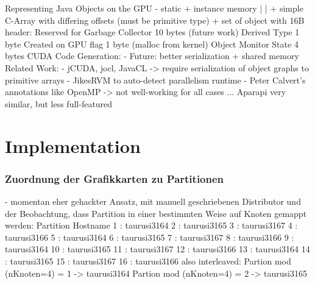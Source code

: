 \begin{frame}
    Representing Java Objects on the GPU
      - static + instance memory
         |              |
         + simple C-Array with differing offsets (must be primitive type)
                        +
            set of object with 16B header:
                Reserved for Garbage Collector 10 bytes (future work)
                Derived Type                    1 byte
                Created on GPU flag             1 byte  (malloc from kernel)
                Object Monitor State            4 bytes
    CUDA Code Generation:
      - Future: better serialization + shared memory
    Related Work:
      - jCUDA, jocl, JavaCL -> require serialization of object graphs to primitive arrays
      - JikesRVM to auto-detect parallelism runtime
      - Peter Calvert’s annotations like OpenMP -> not well-working for all cases ...
      Aparapi very similar, but less full-featured
\end{frame}




\section{Implementation}


\begin{frame}
    \frametitle{Zuordnung der Grafikkarten zu Partitionen}
    - momentan eher gehackter Ansatz, mit manuell geschriebenen Distributor und der Beobachtung, dass Partition in einer bestimmten Weise auf Knoten gemappt werden:
    Partition Hostname
         1 : taurusi3164
         2 : taurusi3165
         3 : taurusi3167
         4 : taurusi3166
         5 : taurusi3164
         6 : taurusi3165
         7 : taurusi3167
         8 : taurusi3166
         9 : taurusi3164
        10 : taurusi3165
        11 : taurusi3167
        12 : taurusi3166
        13 : taurusi3164
        14 : taurusi3165
        15 : taurusi3167
        16 : taurusi3166
     also interleaved:
        Partion mod (nKnoten=4) = 1 -> taurusi3164
        Partion mod (nKnoten=4) = 2 -> taurusi3165
\end{frame}




